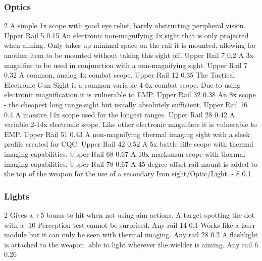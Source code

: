 \subsubsection{Optics}
\vspace{8mm}
\begin{multicols}{2}
    {A simple 1x scope with good eye relief, barely obstructing peripheral vision.}
    {Upper Rail}
    {5}
    {0.15}
    {An electronic non-magnifying 1x sight
    	that is only projected when aiming.
    	Only takes up minimal space on the rail it is mounted,
    	allowing for another item to be mounted without taking this sight off.}
    {Upper Rail}
    {7}
    {0.2}
    {A 3x magnifier to be used in conjunction with a non-magnifying sight.}
    {Upper Rail}
    {7}
    {0.32}
    {A common, analog 4x combat scope.}
    {Upper Rail}
    {12}
    {0.35}
    {The Tactical Electronic Gun Sight is a common variable 4-6x combat scope.
        Due to using electronic magnification it is vulnerable to EMP.}
    {Upper Rail}
    {32}
    {0.38}
    {An 8x scope - the cheapest long range sight but usually absolutely sufficient.}
    {Upper Rail}
    {16}
    {0.4}
    {A massive 14x scope used for the longest ranges.}
    {Upper Rail}
    {28}
    {0.42}
    {A variable 2-14x electronic scope.
        Like other electronic magnifiers it is vulnerable to EMP.}
    {Upper Rail}
    {51}
    {0.43}
    {A non-magnifying thermal imaging sight with a sleek profile created for CQC.}
    {Upper Rail}
    {42}
    {0.52}
    {A 5x battle rifle scope with thermal imaging capabilities.}
    {Upper Rail}
    {68}
    {0.67}
    {A 10x marksman scope with thermal imaging capabilities.}
    {Upper Rail}
    {78}
    {0.67}
    {A 45-degree offset rail mount is added to the top of the weapon
        for the use of a secondary Iron sight/Optic/Light.}
    {-}
    {8}
    {0.1}
\end{multicols}

\subsubsection{Lights}
\vspace{8mm}
\begin{multicols}{2}
    {Gives a +5 bonus to hit when not using aim actions.
        A target spotting the dot with a -10 Perception test cannot be surprised.}
    {Any rail}
    {14}
    {0.1}
    {Works like a laser module but it can only be seen with thermal imaging.}
    {Any rail}
    {28}
    {0.2}
    {A flashlight is attached to the weapon,
        able to light wherever the wielder is aiming.}
    {Any rail}
    {6}
    {0.26}
\end{multicols}

